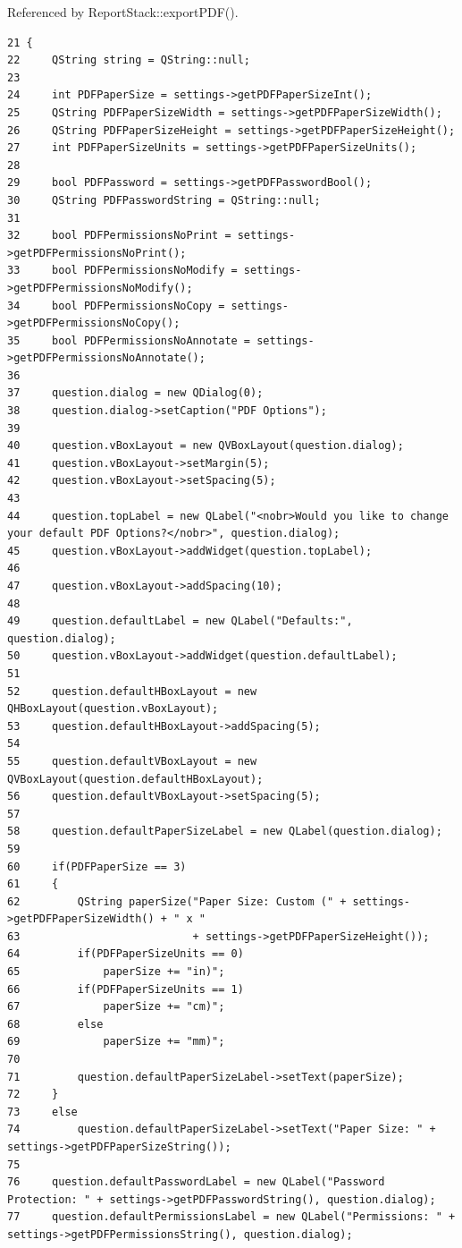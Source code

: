 Referenced by Report\-Stack::export\-PDF().

\footnotesize\begin{verbatim}21 {
22     QString string = QString::null;
23 
24     int PDFPaperSize = settings->getPDFPaperSizeInt();
25     QString PDFPaperSizeWidth = settings->getPDFPaperSizeWidth();
26     QString PDFPaperSizeHeight = settings->getPDFPaperSizeHeight();
27     int PDFPaperSizeUnits = settings->getPDFPaperSizeUnits();
28 
29     bool PDFPassword = settings->getPDFPasswordBool();
30     QString PDFPasswordString = QString::null;
31 
32     bool PDFPermissionsNoPrint = settings->getPDFPermissionsNoPrint();
33     bool PDFPermissionsNoModify = settings->getPDFPermissionsNoModify();
34     bool PDFPermissionsNoCopy = settings->getPDFPermissionsNoCopy();
35     bool PDFPermissionsNoAnnotate = settings->getPDFPermissionsNoAnnotate();
36 
37     question.dialog = new QDialog(0);
38     question.dialog->setCaption("PDF Options");
39 
40     question.vBoxLayout = new QVBoxLayout(question.dialog);
41     question.vBoxLayout->setMargin(5);
42     question.vBoxLayout->setSpacing(5);
43 
44     question.topLabel = new QLabel("<nobr>Would you like to change your default PDF Options?</nobr>", question.dialog);
45     question.vBoxLayout->addWidget(question.topLabel);
46 
47     question.vBoxLayout->addSpacing(10);
48 
49     question.defaultLabel = new QLabel("Defaults:", question.dialog);
50     question.vBoxLayout->addWidget(question.defaultLabel);
51 
52     question.defaultHBoxLayout = new QHBoxLayout(question.vBoxLayout);
53     question.defaultHBoxLayout->addSpacing(5);
54 
55     question.defaultVBoxLayout = new QVBoxLayout(question.defaultHBoxLayout);
56     question.defaultVBoxLayout->setSpacing(5);
57 
58     question.defaultPaperSizeLabel = new QLabel(question.dialog);
59 
60     if(PDFPaperSize == 3)
61     {
62         QString paperSize("Paper Size: Custom (" + settings->getPDFPaperSizeWidth() + " x "
63                           + settings->getPDFPaperSizeHeight());
64         if(PDFPaperSizeUnits == 0)
65             paperSize += "in)";
66         if(PDFPaperSizeUnits == 1)
67             paperSize += "cm)";
68         else
69             paperSize += "mm)";
70 
71         question.defaultPaperSizeLabel->setText(paperSize);
72     }
73     else
74         question.defaultPaperSizeLabel->setText("Paper Size: " + settings->getPDFPaperSizeString());
75 
76     question.defaultPasswordLabel = new QLabel("Password Protection: " + settings->getPDFPasswordString(), question.dialog);
77     question.defaultPermissionsLabel = new QLabel("Permissions: " + settings->getPDFPermissionsString(), question.dialog);

\end{verbatim}
